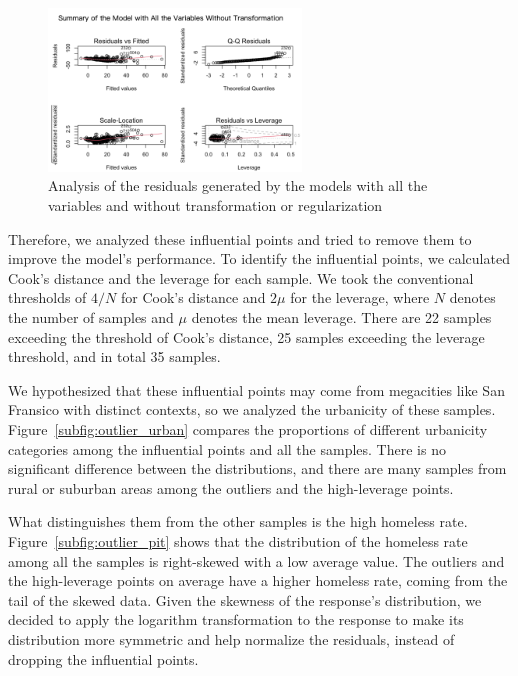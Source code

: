 \documentclass[12pt]{article}
\begin{document}
\begin{figure}[htp]
    \centering
    \includegraphics[width = 0.6\textwidth]{simple.png}
    \caption{Analysis of the residuals generated by the models with all the variables and without transformation or regularization}
    \label{fig:simple}
\end{figure}

Therefore, we analyzed these influential points and tried to remove them to improve the model's performance. To identify the influential points, we calculated Cook's distance and the leverage for each sample. We took the conventional thresholds of $4/N$ for Cook's distance and $2\mu$ for the leverage, where $N$ denotes the number of samples and $\mu$ denotes the mean leverage. There are 22 samples exceeding the threshold of Cook's distance, 25 samples exceeding the leverage threshold, and in total 35 samples. 

We hypothesized that these influential points may come from megacities like San Fransico with distinct contexts, so we analyzed the urbanicity of these samples. Figure~\ref{subfig:outlier_urban} compares the proportions of different urbanicity categories among the influential points and all the samples. There is no significant difference between the distributions, and there are many samples from rural or suburban areas among the outliers and the high-leverage points. 

What distinguishes them from the other samples is the high homeless rate. Figure~\ref{subfig:outlier_pit} shows that the distribution of the homeless rate among all the samples is right-skewed with a low average value. The outliers and the high-leverage points on average have a higher homeless rate, coming from the tail of the skewed data. Given the skewness of the response's distribution, we decided to apply the logarithm transformation to the response to make its distribution more symmetric and help normalize the residuals, instead of dropping the influential points.
\end{document}
